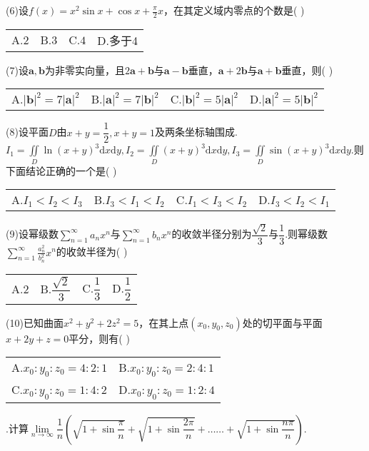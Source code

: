 \documentclass[UTF8]{ctexart}
\begin{document}
\noindent(6)设$ f(x)=x^2\sin{x}+\cos{x}+\frac{\pi}{2}x $，在其定义域内零点的个数是(	)\\
\begin{tabular}{llll}
	A.$ 2 $& B.$ 3 $& C.$ 4 $& D.多于4
\end{tabular}


\noindent(7)设$ \boldsymbol{a},\boldsymbol{b} $为非零实向量，且$ 2\boldsymbol{a}+\boldsymbol{b} $与$ \boldsymbol{a}-\boldsymbol{b} $垂直，$ \boldsymbol{a}+2\boldsymbol{b} $与$ \boldsymbol{a}+\boldsymbol{b} $垂直，则(	)\\
\begin{tabular}{llll}
	A.$ \left|\boldsymbol{b}\right|^2=7\left|\boldsymbol{a}\right|^2 $&
	B.$ \left|\boldsymbol{a}\right|^2=7\left|\boldsymbol{b}\right|^2 $&
	C.$ \left|\boldsymbol{b}\right|^2=5\left|\boldsymbol{a}\right|^2 $&
	D.$ \left|\boldsymbol{a}\right|^2=5\left|\boldsymbol{b}\right|^2 $
\end{tabular}

\thispagestyle{empty}


\noindent(8)设平面$ D $由$ x+y= \dfrac{1}{2},x+y=1 $及两条坐标轴围成.$ I_1=\underset{D}\iint\ln(x+y)^3\mathrm{d}x\mathrm{d}y,I_2=\underset{D}\iint(x+y)^3\mathrm{d}x\mathrm{d}y,I_3=\underset{D}\iint\sin(x+y)^3\mathrm{d}x\mathrm{d}y. $则下面结论正确的一个是(	)\\
\begin{tabular}{llll}
	A.$ I_1<I_2<I_3 $&
	B.$ I_3<I_1<I_2 $&
	C.$ I_1<I_3<I_2 $&
	D.$ I_3<I_2<I_1 $
\end{tabular}


\noindent(9)设幂级数$ \sum\limits_{n=1}^ \infty a_nx^n $与$ \sum\limits_{n=1}^{\infty}b_nx^n $的收敛半径分别为$ \dfrac{\sqrt{2}}{3} $与$ \dfrac{1}{3} $.则幂级数$ \sum\limits_{n=1}^{\infty}\frac{a_n^2}{b_n^2}x^n $的收敛半径为(	)\\
\begin{tabular}{llll}
	A.$ 2 $&
	B.$ \dfrac{\sqrt{2}}{3} $&
	C.$ \dfrac{1}{3} $&
	D.$ \dfrac{1}{2} $
\end{tabular}


\noindent(10)已知曲面$ x^2+y^2+2z^2=5 $，在其上点$ (x_0,y_0,z_0) $处的切平面与平面$ x+2y+z=0 $平分，则有(	)\\
\begin{tabular}{ll}
	A.$ x_0:y_0:z_0=4:2:1 $&
	B.$ x_0:y_0:z_0=2:4:1 $\\
	C.$ x_0:y_0:z_0=1:4:2 $&
	D.$ x_0:y_0:z_0=1:2:4 $
\end{tabular}


.计算$\underset{n\rightarrow\infty}{\lim}\dfrac{1}{n}\left(\sqrt{1+\sin\dfrac{\pi}{n}}+\sqrt{1+\sin\dfrac{2\pi}{n}}+\text{……}+\sqrt{1+\sin\dfrac{n\pi}{n}}\right)$.
\end{document}
